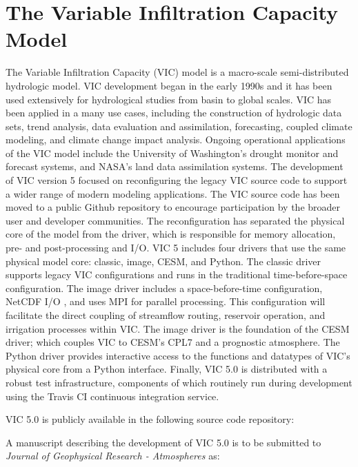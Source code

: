 \section{The Variable Infiltration Capacity Model}
\label{sec:vic_dev}
The Variable Infiltration Capacity (VIC) model is a macro-scale semi-distributed hydrologic model.
VIC development began in the early 1990s and it has been used extensively for hydrological studies from basin to global scales.
VIC has been applied in a many use cases, including the construction of hydrologic data sets, trend analysis, data evaluation and assimilation, forecasting, coupled climate modeling, and climate change impact analysis.
Ongoing operational applications of the VIC model include the University of Washington's drought monitor and forecast systems, and NASA's land data assimilation systems.
The development of VIC version 5 focused on reconfiguring the legacy VIC source code to support a wider range of modern modeling applications.
The VIC source code has been moved to a public Github repository to encourage participation by the broader user and developer communities.
The reconfiguration has separated the physical core of the model from the driver, which is responsible for memory allocation, pre- and post-processing and I/O.
VIC 5 includes four drivers that use the same physical model core: classic, image, CESM, and Python.
The classic driver supports legacy VIC configurations and runs in the traditional time-before-space configuration.
The image driver includes a space-before-time configuration, NetCDF I/O \citep{Rew_1990}, and uses MPI for parallel processing.
This configuration will facilitate the direct coupling of streamflow routing, reservoir operation, and irrigation processes within VIC.
The image driver is the foundation of the CESM driver; which couples VIC to CESM's CPL7 \citep{Craig_2012} and a prognostic atmosphere.
The Python driver provides interactive access to the functions and datatypes of VIC's physical core from a Python interface.
Finally, VIC 5.0 is distributed with a robust test infrastructure, components of which routinely run during development using the Travis CI continuous integration service.

VIC 5.0 is publicly available in the following source code repository:


A manuscript describing the development of VIC 5.0 is to be submitted to \textit{Journal of Geophysical Research - Atmospheres} as:


